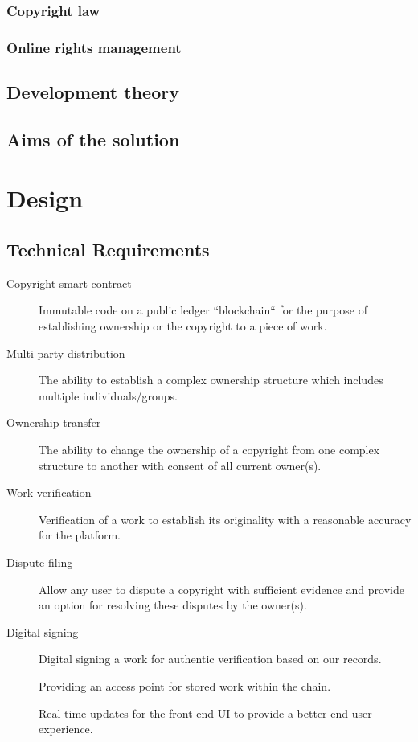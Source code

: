 \documentclass[12pt]{article}
\begin{document}
\subsubsection{Copyright law}
\subsubsection{Online rights management}

\subsection{Development theory}

\subsection{Aims of the solution}

\section{Design}

\subsection{Technical Requirements}

\begin{description}
	\item[Copyright smart contract] Immutable code on a public ledger “blockchain“ for the purpose of establishing ownership or the copyright to a piece of work.
	\item[Multi-party distribution] The ability to establish a complex ownership structure which includes multiple individuals/groups.
	\item[Ownership transfer] The ability to change the ownership of a copyright from one complex structure to another with consent of all current owner(s).
	\item[Work verification] Verification of a work to establish its originality with a reasonable accuracy for the platform.
	\item[Dispute filing] Allow any user to dispute a copyright with sufficient evidence and provide an option for resolving these disputes by the owner(s).
	\item[Digital signing] Digital signing a work for authentic verification based on our records.
	\item[\color{orange}{Decentralised Work CDN & proxy}] Providing an access point for stored work within the chain.
	\item[\color{orange}{Web-socket updates}] Real-time updates for the front-end UI to provide a better end-user experience.
\end{description}
\end{document}
